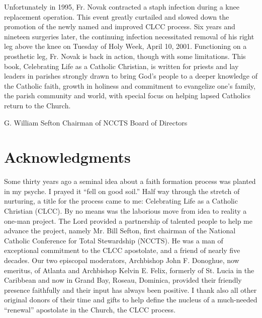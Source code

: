 \documentclass[oneside]{book}
\begin{document}
Unfortunately in 1995, Fr. Novak contracted a staph infection during a knee
replacement operation. This event greatly curtailed and slowed down the
promotion of the newly named and improved CLCC process. Six years and nineteen
surgeries later, the continuing infection necessitated removal of his right leg
above the knee on Tuesday of Holy Week, April 10, 2001.  Functioning on a
prosthetic leg, Fr. Novak is back in action, though with some limitations. This
book, Celebrating Life as a Catholic Christian, is written for priests and lay
leaders in parishes strongly drawn to bring God's people to a deeper knowledge
of the Catholic faith, growth in holiness and commitment to evangelize one's
family, the parish community and world, with special focus on helping lapsed
Catholics return to the Church.

G. William Sefton
Chairman of NCCTS Board of Directors


\chapter{Acknowledgments}

Some thirty years ago a seminal idea about a faith formation process was planted
in my psyche. I prayed it ``fell on good soil.'' Half way through the stretch of
nurturing, a title for the process came to me: Celebrating Life as a Catholic
Christian (CLCC). By no means was the laborious move from idea to reality a
one-man project. The Lord provided a partnership of talented people to help me
advance the project, namely Mr. Bill Sefton, first chairman of the National
Catholic Conference for Total Stewardship (NCCTS). He was a man of exceptional
commitment to the CLCC apostolate, and a friend of nearly five decades. Our two
episcopal moderators, Archbishop John F. Donoghue, now emeritus, of Atlanta and
Archbishop Kelvin E. Felix, formerly of St. Lucia in the Caribbean and now in
Grand Bay, Roseau, Dominica, provided their friendly presence faithfully and
their input has always been positive. I thank also all other original donors of
their time and gifts to help define the nucleus of a much-needed ``renewal''
apostolate in the Church, the CLCC process.
\end{document}
